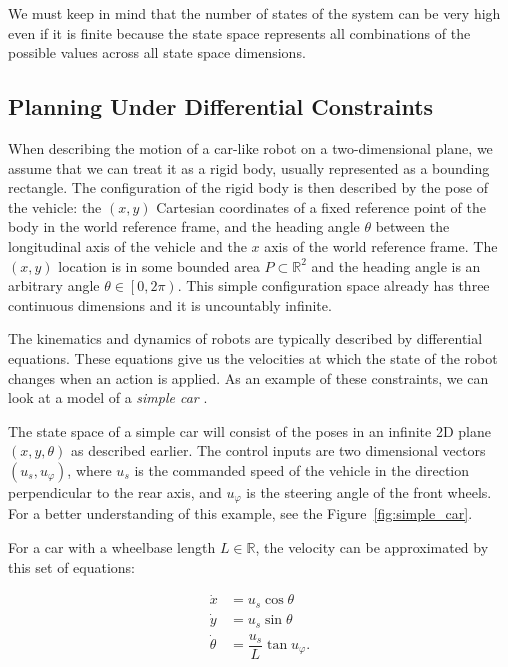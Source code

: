 We must keep in mind that the number of states of the system can be very high even if it is finite because the state space represents all combinations of the possible values across all state space dimensions.

\subsection{Planning Under Differential Constraints}
\label{sec:planning_under_differential_constraints}

When describing the motion of a car-like robot on a two-dimensional plane, we assume that we can treat it as a rigid body, usually represented as a bounding rectangle. The configuration of the rigid body is then described by the pose of the vehicle: the $\left(x,y\right)$ Cartesian coordinates of a fixed reference point of the body in the world reference frame, and the heading angle $\theta$ between the longitudinal axis of the vehicle and the $x$ axis of the world reference frame. The $(x, y)$ location is in some bounded area $P\subset\mathbb{R}^2$ and the heading angle is an arbitrary angle $\theta\in\left[0,2\pi\right)$. This simple configuration space already has three continuous dimensions and it is uncountably infinite.

The kinematics and dynamics of robots are typically described by differential equations. These equations give us the velocities at which the state of the robot changes when an action is applied. As an example of these constraints, we can look at a model of a \textit{simple car} \cite[Section~13.1.2.1]{lavalle_2006}.

\begin{example}
The state space of a simple car will consist of the poses in an infinite 2D plane $(x, y, \theta)$ as described earlier. The control inputs are two dimensional vectors $\left(u_s, u_\varphi\right)$, where $u_s$ is the commanded speed of the vehicle in the direction perpendicular to the rear axis, and $u_\varphi$ is the steering angle of the front wheels. For a better understanding of this example, see the Figure~\ref{fig:simple_car}.

For a car with a wheelbase length $L\in\mathbb{R}$, the velocity can be approximated by this set of equations:

\begin{equation}
\begin{aligned}
	\dot{x}&=u_s \cos \theta \\
	\dot{y}&=u_s \sin \theta \\
	\dot{\theta}&=\dfrac{u_s}{L} \tan u_\varphi.
\end{aligned}
\end{equation}
\end{example}

